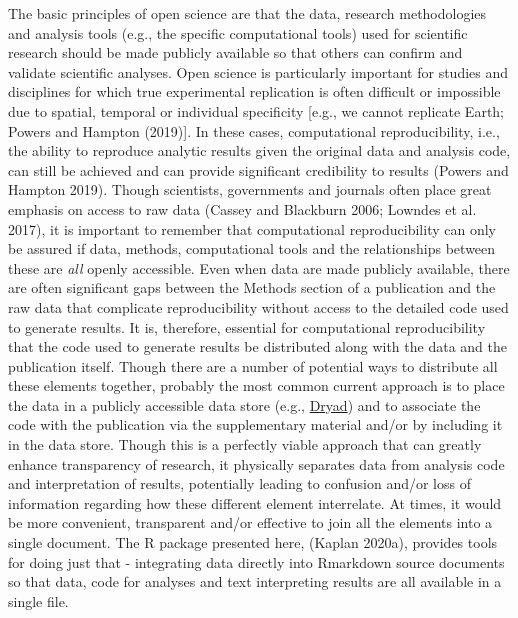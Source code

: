 The basic principles of open science are that the data, research methodologies and analysis tools (e.g., the specific computational tools) used for scientific research should be made publicly available so that others can confirm and validate scientific analyses. Open science is particularly important for studies and disciplines for which true experimental replication is often difficult or impossible due to spatial, temporal or individual specificity {[}e.g., we cannot replicate Earth; Powers and Hampton (2019){]}. In these cases, computational reproducibility, i.e., the ability to reproduce analytic results given the original data and analysis code, can still be achieved and can provide significant credibility to results (Powers and Hampton 2019). Though scientists, governments and journals often place great emphasis on access to raw data (Cassey and Blackburn 2006; Lowndes et al. 2017), it is important to remember that computational reproducibility can only be assured if data, methods, computational tools and the relationships between these are \emph{all} openly accessible. Even when data are made publicly available, there are often significant gaps between the Methods section of a publication and the raw data that complicate reproducibility without access to the detailed code used to generate results. It is, therefore, essential for computational reproducibility that the code used to generate results be distributed along with the data and the publication itself. Though there are a number of potential ways to distribute all these elements together, probably the most common current approach is to place the data in a publicly accessible data store (e.g., \href{https://datadryad.org}{Dryad}) and to associate the code with the publication via the supplementary material and/or by including it in the data store. Though this is a perfectly viable approach that can greatly enhance transparency of research, it physically separates data from analysis code and interpretation of results, potentially leading to confusion and/or loss of information regarding how these different element interrelate. At times, it would be more convenient, transparent and/or effective to join all the elements into a single document. The R package presented here,  (Kaplan 2020a), provides tools for doing just that - integrating data directly into Rmarkdown source documents so that data, code for analyses and text interpreting results are all available in a single file.

